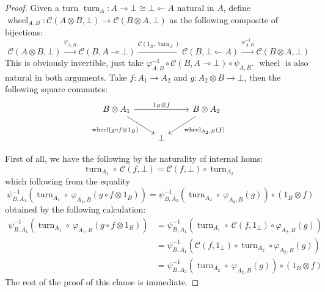 \documentclass[8pt]{article}
\theoremstyle{definition}
\theoremstyle{definition}
\theoremstyle{definition}
\theoremstyle{definition}
\theoremstyle{definition}
\theoremstyle{definition}
\theoremstyle{definition}
\theoremstyle{definition}
\theoremstyle{definition}
\theoremstyle{definition}
\theoremstyle{definition}
\theoremstyle{definition}
\theoremstyle{definition}
\theoremstyle{definition}
\theoremstyle{question}
\begin{document}
\begin{proof}
  Given a turn $\operatorname{turn}_A : A \multimap \bot \cong \bot \multimapinv A$ natural in $A$,
  define $\operatorname{wheel}_{A,B} : \mathcal{C}(A \otimes B, \bot) \to \mathcal{C}(B \otimes A, \bot)$
  as the following composite of bijections:
  \[
  \mathcal{C}(A \otimes B, \bot) \xrightarrow{\varphi_{A,B}} \mathcal{C}(B, A \multimap \bot) \xrightarrow{\mathcal{C}(1_B, \operatorname{turn}_A)} \mathcal{C}(B, \bot \multimapinv A) \xrightarrow{\psi^{-1}_{A,B}} \mathcal{C}(B \otimes A, \bot)
  \]
  This is obviously invertible, just take $\varphi^{-1}_{A,B} \circ \mathcal{C}(B, A \multimap \bot) \circ \psi_{A,B}$.
  $\operatorname{wheel}$ is also natural in both arguments. 
  Take $f : A_1 \to A_2$ and $g : A_2 \otimes B \to \bot$, then the following square commutes:
  \[
  \begin{tikzcd}
    B \otimes A_1 \ar[rr, "1_B \otimes f"] \ar[dr, "\operatorname{wheel}(g \circ f \otimes 1_B)"'] && B \otimes A_2 \ar[dl, "\operatorname{wheel}_{A_2,B}(f)"] \\
    & \bot
  \end{tikzcd}
  \]

  First of all, we have the following by the naturality of internal homs:
  \begin{equation}~\label{eq:1}
  \operatorname{turn}_{A_1} \circ \: \mathcal{C}(f,\bot) = \mathcal{C}(f,\bot) \circ \operatorname{turn}_{A_2}
  \end{equation}
  which following from the equality
  \begin{equation}~\label{e2:1}
    \psi^{-1}_{B,A_1}(\operatorname{turn}_{A_1} \circ \: \varphi_{A_1,B}(g \circ f \otimes 1_B)) = \psi^{-1}_{B,A_2} (\operatorname{turn}_{A_2} \circ \: \varphi_{A_2,B}(g)) \circ (1_B \otimes f)
  \end{equation}
  obtained by the following calculation:
  \begin{align*}
    \psi^{-1}_{B,A_1}(\operatorname{turn}_{A_1} \circ \: \varphi_{A_1,B}(g \circ f \otimes 1_B)) &= \psi^{-1}_{B,A_1}(\operatorname{turn}_{A_1} \circ \: \mathcal{C}(f,1_{\bot}) \circ \varphi_{A_2,B}(g)) \\
    &= \psi^{-1}_{B,A_1}(\mathcal{C}(f,1_{\bot}) \circ \operatorname{turn}_{A_2} \circ \varphi_{A_2,B}(g)) \\
    &= \psi^{-1}_{B,A_2} (\operatorname{turn}_{A_2} \circ \: \varphi_{A_2,B}(g)) \circ (1_B \otimes f)
  \end{align*}
  The rest of the proof of this clause is immediate.
  

\end{proof}
\end{document}

